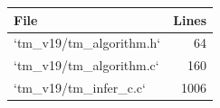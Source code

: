 \begin{tabular}{lr}
\toprule
File & Lines \\
\midrule
`tm\_v19/tm\_algorithm.h` & 64 \\
`tm\_v19/tm\_algorithm.c` & 160 \\
`tm\_v19/tm\_infer\_c.c` & 1006 \\
\bottomrule
\end{tabular}
